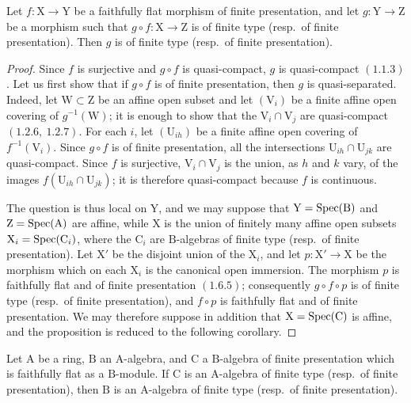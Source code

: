 \begin{proposition}[11.3.16]
\label{IV.11.3.16}
Let $f:\mathrm{X}\to\mathrm{Y}$ be a faithfully flat morphism of finite presentation, and let $g:\mathrm{Y}\to\mathrm{Z}$ be a morphism such that $g\circ f:\mathrm{X}\to\mathrm{Z}$ is of finite type (resp.\ of finite presentation). Then $g$ is of finite type (resp.\ of finite presentation).
\end{proposition}

\begin{proof}
Since $f$ is surjective and $g\circ f$ is quasi-compact, $g$ is quasi-compact $(1.1.3)$. Let us first show that if $g\circ f$ is of finite presentation, then $g$ is quasi-separated. Indeed, let $\mathrm{W}\subset\mathrm{Z}$ be an affine open subset and let $(\mathrm{V}_i)$ be a finite affine open covering of $g^{-1}(\mathrm{W})$; it is enough to show that the $\mathrm{V}_i\cap\mathrm{V}_j$ are quasi-compact $(1.2.6,\ 1.2.7)$. For each $i$, let $(\mathrm{U}_{ih})$ be a finite affine open covering of $f^{-1}(\mathrm{V}_i)$. Since $g\circ f$ is of finite presentation, all the intersections $\mathrm{U}_{ih}\cap\mathrm{U}_{jk}$ are quasi-compact. Since $f$ is surjective, $\mathrm{V}_i\cap\mathrm{V}_j$ is the union, as $h$ and $k$ vary, of the images $f(\mathrm{U}_{ih}\cap\mathrm{U}_{jk})$; it is therefore quasi-compact because $f$ is continuous.

The question is thus local on $\mathrm{Y}$, and we may suppose that $\mathrm{Y}=\operatorname{Spec}(\mathrm{B})$ and $\mathrm{Z}=\operatorname{Spec}(\mathrm{A})$ are affine, while $\mathrm{X}$ is the union of finitely many affine open subsets $\mathrm{X}_i=\operatorname{Spec}(\mathrm{C}_i)$, where the $\mathrm{C}_i$ are $\mathrm{B}$-algebras of finite type (resp.\ of finite presentation). Let $\mathrm{X}'$ be the disjoint union of the $\mathrm{X}_i$, and let $p:\mathrm{X}'\to\mathrm{X}$ be the morphism which on each $\mathrm{X}_i$ is the canonical open immersion. The morphism $p$ is faithfully flat and of finite presentation $(1.6.5)$; consequently $g\circ f\circ p$ is of finite type (resp.\ of finite presentation), and $f\circ p$ is faithfully flat and of finite presentation. We may therefore suppose in addition that $\mathrm{X}=\operatorname{Spec}(\mathrm{C})$ is affine, and the proposition is reduced to the following corollary.
\end{proof}

\begin{corollary}[11.3.17]
\label{IV.11.3.17}
Let $\mathrm{A}$ be a ring, $\mathrm{B}$ an $\mathrm{A}$-algebra, and $\mathrm{C}$ a $\mathrm{B}$-algebra of finite presentation which is faithfully flat as a $\mathrm{B}$-module. If $\mathrm{C}$ is an $\mathrm{A}$-algebra of finite type (resp.\ of finite presentation), then $\mathrm{B}$ is an $\mathrm{A}$-algebra of finite type (resp.\ of finite presentation).
\end{corollary}

